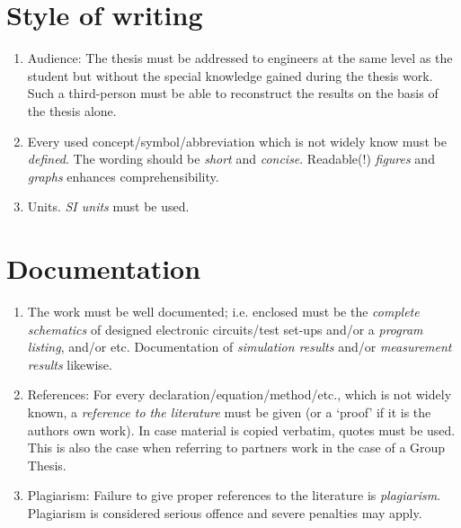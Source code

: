 \section{Style of writing}

\begin{enumerate}

\item Audience:
The thesis must be addressed to engineers at the same level as the
student but without the special knowledge gained during the thesis work.
Such a third-person must be able to reconstruct the results on the basis
of the thesis alone.

\item
Every used concept/symbol/abbreviation which is not widely know must be \emph{defined}.
The wording should be \emph{short} and \emph{concise}.  
Readable(!) \emph{figures} and \emph{graphs} enhances comprehensibility.

\item Units.
\emph{SI units} must be used.
\end{enumerate}

\section{Documentation}

\begin{enumerate}
\item
The work must be well documented; i.e. enclosed must be the \emph{complete
schematics} of designed electronic circuits/test set-ups and/or a
\emph{program listing}, and/or etc.
Documentation of \emph{simulation results} and/or \emph{measurement
results} likewise.
\item References:
For every declaration/equation/method/etc., which is not widely known,
a \emph{reference to the literature} must be given (or a `proof' if it is
the authors own work).
In case material is copied verbatim, quotes must be used.
This is also the case when referring to partners
work in the case of a Group Thesis.

\item Plagiarism:
Failure to give proper references to the literature is \emph{plagiarism}.
Plagiarism is considered serious offence and severe penalties may apply.

\end{enumerate}

